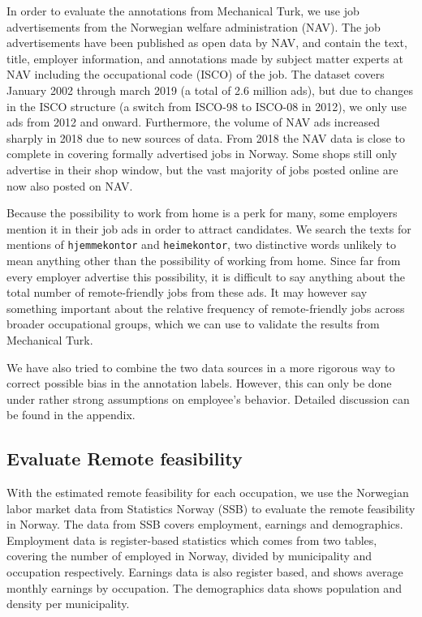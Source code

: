 \documentclass[11pt,]{article}
\begin{document}
In order to evaluate the annotations from Mechanical Turk, we use job
advertisements from the Norwegian welfare administration (NAV). The job
advertisements have been published as open data by NAV, and contain the
text, title, employer information, and annotations made by subject
matter experts at NAV including the occupational code (ISCO) of the job.
The dataset covers January 2002 through march 2019 (a total of 2.6
million ads), but due to changes in the ISCO structure (a switch from
ISCO-98 to ISCO-08 in 2012), we only use ads from 2012 and onward.
Furthermore, the volume of NAV ads increased sharply in 2018 due to new
sources of data. From 2018 the NAV data is close to complete in covering
formally advertised jobs in Norway. Some shops still only advertise in
their shop window, but the vast majority of jobs posted online are now
also posted on NAV.

Because the possibility to work from home is a perk for many, some
employers mention it in their job ads in order to attract candidates. We
search the texts for mentions of \texttt{hjemmekontor} and
\texttt{heimekontor}, two distinctive words unlikely to mean anything
other than the possibility of working from home. Since far from every
employer advertise this possibility, it is difficult to say anything
about the total number of remote-friendly jobs from these ads. It may
however say something important about the relative frequency of
remote-friendly jobs across broader occupational groups, which we can
use to validate the results from Mechanical Turk.

We have also tried to combine the two data sources in a more rigorous
way to correct possible bias in the annotation labels. However, this can
only be done under rather strong assumptions on employee's behavior.
Detailed discussion can be found in the appendix.

\hypertarget{evaluate-remote-feasibility}{%
\subsection{Evaluate Remote
feasibility}\label{evaluate-remote-feasibility}}

With the estimated remote feasibility for each occupation, we use the
Norwegian labor market data from Statistics Norway (SSB) to evaluate the
remote feasibility in Norway. The data from SSB covers employment,
earnings and demographics. Employment data is register-based statistics
which comes from two tables, covering the number of employed in Norway,
divided by municipality and occupation respectively. Earnings data is
also register based, and shows average monthly earnings by occupation.
The demographics data shows population and density per municipality.
\end{document}
